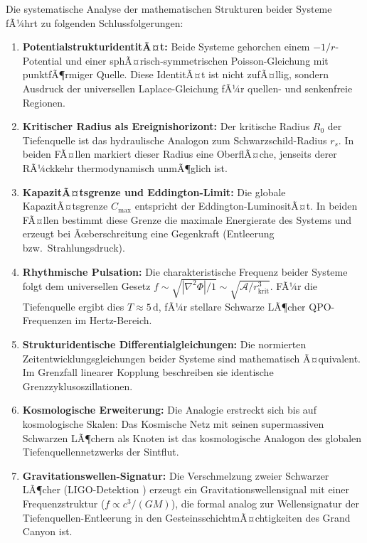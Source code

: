 ﻿\documentclass[12pt,a4paper]{report}
\begin{document}
Die systematische Analyse der mathematischen Strukturen beider Systeme fÃ¼hrt zu folgenden Schlussfolgerungen:

\begin{enumerate}
	\item \textbf{PotentialstrukturidentitÃ¤t:} Beide Systeme gehorchen einem $-1/r$-Potential und einer sphÃ¤risch-symmetrischen Poisson-Gleichung mit punktfÃ¶rmiger Quelle. Diese IdentitÃ¤t ist nicht zufÃ¤llig, sondern Ausdruck der universellen Laplace-Gleichung fÃ¼r quellen- und senkenfreie Regionen.
	
	\item \textbf{Kritischer Radius als Ereignishorizont:} Der kritische Radius $R_0$ der Tiefenquelle ist das hydraulische Analogon zum Schwarzschild-Radius $r_s$. In beiden FÃ¤llen markiert dieser Radius eine OberflÃ¤che, jenseits derer RÃ¼ckkehr thermodynamisch unmÃ¶glich ist.
	
	\item \textbf{KapazitÃ¤tsgrenze und Eddington-Limit:} Die globale KapazitÃ¤tsgrenze $C_{\max}$ entspricht der Eddington-LuminositÃ¤t. In beiden FÃ¤llen bestimmt diese Grenze die maximale Energierate des Systems und erzeugt bei Ãœberschreitung eine Gegenkraft (Entleerung bzw.\ Strahlungsdruck).
	
	\item \textbf{Rhythmische Pulsation:} Die charakteristische Frequenz beider Systeme folgt dem universellen Gesetz $f \sim \sqrt{|\nabla^2\Phi|/1} \sim \sqrt{\mathcal{A}/r_{\mathrm{krit}}^3}$. FÃ¼r die Tiefenquelle ergibt dies $T \approx 5\,\mathrm{d}$, fÃ¼r stellare Schwarze LÃ¶cher QPO-Frequenzen im Hertz-Bereich.
	
	\item \textbf{Strukturidentische Differentialgleichungen:} Die normierten Zeitentwicklungsgleichungen beider Systeme sind mathematisch Ã¤quivalent. Im Grenzfall linearer Kopplung beschreiben sie identische Grenzzyklusoszillationen.
	
	\item \textbf{Kosmologische Erweiterung:} Die Analogie erstreckt sich bis auf kosmologische Skalen: Das Kosmische Netz mit seinen supermassiven Schwarzen LÃ¶chern als Knoten ist das kosmologische Analogon des globalen Tiefenquellennetzwerks der Sintflut.
	
	\item \textbf{Gravitationswellen-Signatur:} Die Verschmelzung zweier Schwarzer LÃ¶cher (LIGO-Detektion \cite{abbott2016ligo}) erzeugt ein Gravitationswellensignal mit einer Frequenzstruktur ($f \propto c^3/(GM)$), die formal analog zur Wellensignatur der Tiefenquellen-Entleerung in den GesteinsschichtmÃ¤chtigkeiten des Grand Canyon ist.
\end{enumerate}
\end{document}
